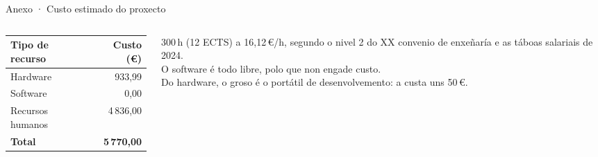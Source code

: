 \begin{frame}{Anexo · Custo estimado do proxecto}
  \begin{columns}[c]
    \begin{column}{0.46\textwidth}
      {\footnotesize
      \begin{tabular}{l|r}
        \rowcolor{udcpink!25}
        \textbf{Tipo de recurso} & \textbf{Custo (€)} \\\hline
        Hardware         & 933,99 \\
        Software         & 0,00 \\
        Recursos humanos & 4\,836,00 \\\hline
        \rowcolor{udcpink!25}
        \textbf{Total}   & \textbf{5\,770,00} \\
      \end{tabular}}
    \end{column}
    \begin{column}{0.50\textwidth}
      {\footnotesize
      300\,h (12 ECTS) a 16,12\,€/h, segundo o nivel 2 do XX convenio de
      enxeñaría e as táboas salariais de 2024.\\[0.5em]
      O software é todo libre, polo que non engade custo.\\[0.5em]
      Do hardware, o groso é o portátil de desenvolvemento: a
       custa uns 50\,€.}
    \end{column}
  \end{columns}
\end{frame}
